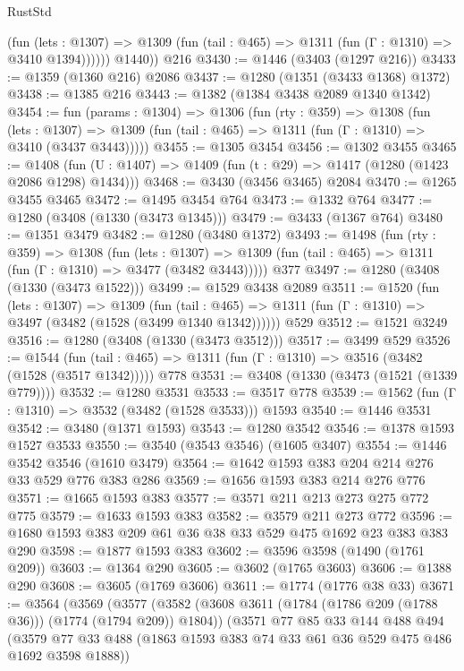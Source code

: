 \begin{lexlean}{RustStd}
\begin{coremodule}
{\begin{coremodule}
{{{{{{{{{{{{              (fun (lets : @1307) =>
              @1309 (fun (tail : @465) => @1311 (fun (Γ : @1310) => @3410 @1394))))))
        @1440))
    @216
@3430 := @1446 (@3403 (@1297 @216))
@3433 := @1359 (@1360 @216) @2086
@3437 := @1280 (@1351 (@3433 @1368) @1372)
@3438 := @1385 @216
@3443 := @1382 (@1384 @3438 @2089 @1340 @1342)
@3454 := fun (params : @1304) =>
  @1306
    (fun (rty : @359) =>
    @1308
      (fun (lets : @1307) =>
      @1309 (fun (tail : @465) => @1311 (fun (Γ : @1310) => @3410 (@3437 @3443)))))
@3455 := @1305 @3454
@3456 := @1302 @3455
@3465 := @1408 (fun (U : @1407) => @1409 (fun (t : @29) => @1417 (@1280 (@1423 @2086 @1298) @1434)))
@3468 := @3430 (@3456 @3465) @2084
@3470 := @1265 @3455 @3465
@3472 := @1495 @3454 @764
@3473 := @1332 @764
@3477 := @1280 (@3408 (@1330 (@3473 @1345)))
@3479 := @3433 (@1367 @764)
@3480 := @1351 @3479
@3482 := @1280 (@3480 @1372)
@3493 := @1498
    (fun (rty : @359) =>
    @1308
      (fun (lets : @1307) =>
      @1309 (fun (tail : @465) => @1311 (fun (Γ : @1310) => @3477 (@3482 @3443)))))
    @377
@3497 := @1280 (@3408 (@1330 (@3473 @1522)))
@3499 := @1529 @3438 @2089
@3511 := @1520
    (fun (lets : @1307) =>
    @1309
      (fun (tail : @465) => @1311 (fun (Γ : @1310) => @3497 (@3482 (@1528 (@3499 @1340 @1342))))))
    @529
@3512 := @1521 @3249
@3516 := @1280 (@3408 (@1330 (@3473 @3512)))
@3517 := @3499 @529
@3526 := @1544
    (fun (tail : @465) => @1311 (fun (Γ : @1310) => @3516 (@3482 (@1528 (@3517 @1342)))))
    @778
@3531 := @3408 (@1330 (@3473 (@1521 (@1339 @779))))
@3532 := @1280 @3531
@3533 := @3517 @778
@3539 := @1562 (fun (Γ : @1310) => @3532 (@3482 (@1528 @3533))) @1593
@3540 := @1446 @3531
@3542 := @3480 (@1371 @1593)
@3543 := @1280 @3542
@3546 := @1378 @1593 @1527 @3533
@3550 := @3540 (@3543 @3546) (@1605 @3407)
@3554 := @1446 @3542 @3546 (@1610 @3479)
@3564 := @1642 @1593 @383 @204 @214 @276 @33 @529 @776 @383 @286
@3569 := @1656 @1593 @383 @214 @276 @776
@3571 := @1665 @1593 @383
@3577 := @3571 @211 @213 @273 @275 @772 @775
@3579 := @1633 @1593 @383
@3582 := @3579 @211 @273 @772
@3596 := @1680 @1593 @383 @209 @61 @36 @38 @33 @529 @475 @1692 @23 @383 @383 @290
@3598 := @1877 @1593 @383
@3602 := @3596 @3598 (@1490 (@1761 @209))
@3603 := @1364 @290
@3605 := @3602 (@1765 @3603)
@3606 := @1388 @290
@3608 := @3605 (@1769 @3606)
@3611 := @1774 (@1776 @38 @33)
@3671 := @3564
    (@3569
      (@3577
        (@3582 (@3608 @3611 (@1784 (@1786 @209 (@1788 @36))) (@1774 (@1794 @209)) @1804))
        (@3571
          @77
          @85
          @33
          @144
          @488
          @494
          (@3579 @77 @33 @488 (@1863 @1593 @383 @74 @33 @61 @36 @529 @475 @486 @1692 @3598 @1888))
}}}}}}}}}}}}
\end{coremodule}}
\end{coremodule}
\end{lexlean}
